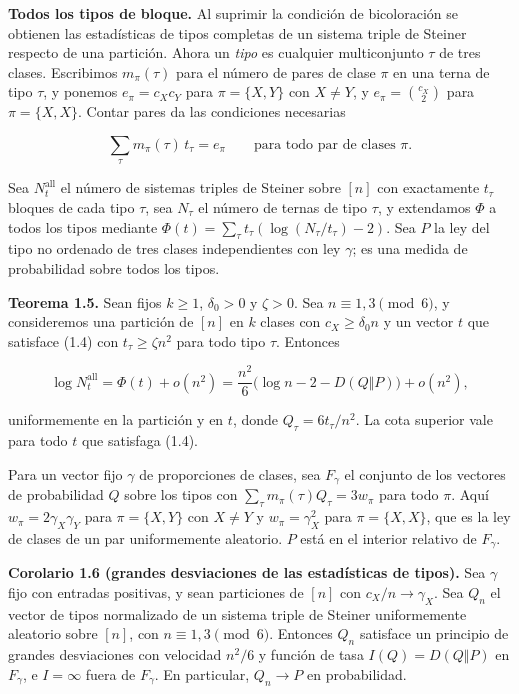 \documentclass[spanish,11pt,a4paper]{article}
\begin{document}
\textbf{Todos los tipos de bloque.} Al suprimir la condición de bicoloración se obtienen las estadísticas de tipos completas de un sistema triple de Steiner respecto de una partición. Ahora un \emph{tipo} es cualquier multiconjunto \(\tau\) de tres clases. Escribimos \(m_\pi(\tau)\) para el número de pares de clase \(\pi\) en una terna de tipo \(\tau\), y ponemos \(e_\pi=c_Xc_Y\) para \(\pi=\{X,Y\}\) con \(X\ne Y\), y \(e_\pi=\binom{c_X}{2}\) para \(\pi=\{X,X\}\). Contar pares da las condiciones necesarias

\nopagebreak[4]
\[\sum_\tau m_\pi(\tau)\,t_\tau=e_\pi\qquad\text{para todo par de clases }\pi.\tag{1.4}\]

Sea \(N^{\mathrm{all}}_t\) el número de sistemas triples de Steiner sobre \([n]\) con exactamente \(t_\tau\) bloques de cada tipo \(\tau\), sea \(N_\tau\) el número de ternas de tipo \(\tau\), y extendamos \(\Phi\) a todos los tipos mediante \(\Phi(t)=\sum_\tau t_\tau(\log(N_\tau/t_\tau)-2)\). Sea \(P\) la ley del tipo no ordenado de tres clases independientes con ley \(\gamma\); es una medida de probabilidad sobre todos los tipos.

\textbf{Teorema 1.5.} Sean fijos \(k\ge1\), \(\delta_0>0\) y \(\zeta>0\). Sea \(n\equiv1,3\pmod 6\), y consideremos una partición de \([n]\) en \(k\) clases con \(c_X\ge\delta_0 n\) y un vector \(t\) que satisface (1.4) con \(t_\tau\ge\zeta n^2\) para todo tipo \(\tau\). Entonces

\nopagebreak[4]
\[\log N^{\mathrm{all}}_t=\Phi(t)+o(n^2)=\frac{n^2}{6}\bigl(\log n-2-D(Q\Vert P)\bigr)+o(n^2),\]

uniformemente en la partición y en \(t\), donde \(Q_\tau=6t_\tau/n^2\). La cota superior vale para todo \(t\) que satisfaga (1.4).

Para un vector fijo \(\gamma\) de proporciones de clases, sea \(F_\gamma\) el conjunto de los vectores de probabilidad \(Q\) sobre los tipos con \(\sum_\tau m_\pi(\tau)Q_\tau=3w_\pi\) para todo \(\pi\). Aquí \(w_\pi=2\gamma_X\gamma_Y\) para \(\pi=\{X,Y\}\) con \(X\ne Y\) y \(w_\pi=\gamma_X^2\) para \(\pi=\{X,X\}\), que es la ley de clases de un par uniformemente aleatorio. \(P\) está en el interior relativo de \(F_\gamma\).

\textbf{Corolario 1.6 (grandes desviaciones de las estadísticas de tipos).} Sea \(\gamma\) fijo con entradas positivas, y sean particiones de \([n]\) con \(c_X/n\to\gamma_X\). Sea \(Q_n\) el vector de tipos normalizado de un sistema triple de Steiner uniformemente aleatorio sobre \([n]\), con \(n\equiv1,3\pmod 6\). Entonces \(Q_n\) satisface un principio de grandes desviaciones con velocidad \(n^2/6\) y función de tasa \(I(Q)=D(Q\Vert P)\) en \(F_\gamma\), e \(I=\infty\) fuera de \(F_\gamma\). En particular, \(Q_n\to P\) en probabilidad.
\end{document}
